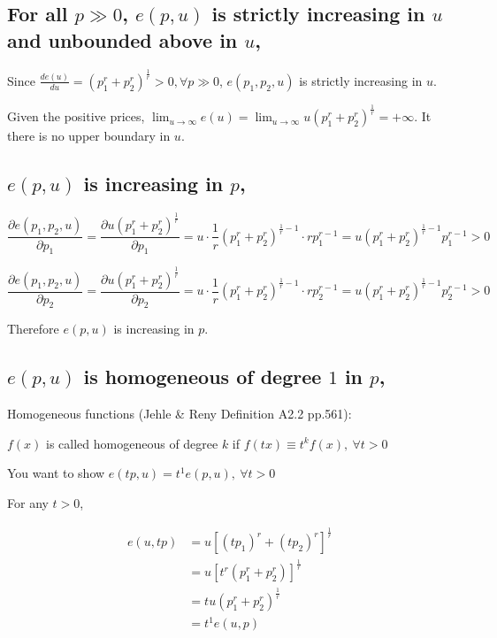 \documentclass{article}
\begin{document}
\subsection{For all $p \gg 0$, $e(p, u)$ is strictly increasing in $u$ and unbounded above in $u$,}


Since $\frac{d e(u)}{d u} = (p_1^{r} + p_2^{r})^{\frac{1}{r}} > 0, \forall p \gg 0$,
$e(p_1,p_2,u)$ is strictly increasing in $u$.

Given the positive prices, $\lim_{u\to\infty} e(u) = \lim_{u\to\infty} u(p_1^{r} + p_2^{r})^{\frac{1}{r}}= + \infty$. It there is no upper boundary in $u$.


\subsection{$e(p, u)$ is increasing in $p$,}

$$\frac{\partial e(p_1,p_2, u)}{\partial p_1} = \frac{\partial u(p_1^{r} + p_2^{r})^{\frac{1}{r}} }{\partial p_1} = u \cdot \frac{1}{r}(p_1^{r} + p_2^{r})^{\frac{1}{r} - 1} \cdot r  p_1^{r-1} =
u (p_1^{r} + p_2^{r})^{\frac{1}{r} - 1} p_1^{r-1} > 0$$

$$\frac{\partial e(p_1,p_2, u)}{\partial p_2} = \frac{\partial u(p_1^{r} + p_2^{r})^{\frac{1}{r}} }{\partial p_2} = u \cdot \frac{1}{r}(p_1^{r} + p_2^{r})^{\frac{1}{r} - 1} \cdot r  p_2^{r-1} =
u (p_1^{r} + p_2^{r})^{\frac{1}{r} - 1} p_2^{r-1} > 0$$

Therefore $e(p, u)$ is increasing in $p$.


\subsection{$e(p, u)$ is homogeneous of degree $1$ in $p$,}

\begin{mdframed}[backgroundcolor=blue!20,linecolor=white]
Homogeneous functions (Jehle \& Reny Definition A2.2 pp.561):

$f(x)$ is called homogeneous of degree $k$ if $f(tx) \equiv t^kf(x),\ \forall t > 0$

You want to show $e(tp, u) = t^1e(p, u),\ \forall t > 0$
\end{mdframed}

For any $t>0$,

\begin{align*}
e(u,tp) &= u[(tp_1)^{r} + (tp_2)^{r}]^{\frac{1}{r}} \\
&= u[t^r(p_1^{r} + p_2^{r})]^{\frac{1}{r}} \\
&= tu(p_1^{r} + p_2^{r})^{\frac{1}{r}} \\
&= t^1e(u,p)
\end{align*}
\end{document}
